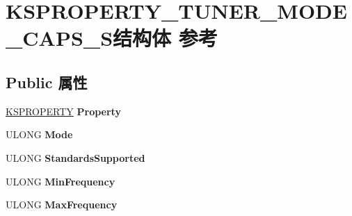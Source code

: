 \hypertarget{struct_k_s_p_r_o_p_e_r_t_y___t_u_n_e_r___m_o_d_e___c_a_p_s___s}{}\section{K\+S\+P\+R\+O\+P\+E\+R\+T\+Y\+\_\+\+T\+U\+N\+E\+R\+\_\+\+M\+O\+D\+E\+\_\+\+C\+A\+P\+S\+\_\+\+S结构体 参考}
\label{struct_k_s_p_r_o_p_e_r_t_y___t_u_n_e_r___m_o_d_e___c_a_p_s___s}
\subsection*{Public 属性}
\begin{DoxyCompactItemize}
\item 
\mbox{\label{struct_k_s_p_r_o_p_e_r_t_y___t_u_n_e_r___m_o_d_e___c_a_p_s___s_a3044594987a128f1148bae15dc81c62f}} 
\hyperlink{struct_k_s_i_d_e_n_t_i_f_i_e_r}{K\+S\+P\+R\+O\+P\+E\+R\+TY} {\bfseries Property}
\item 
\mbox{\label{struct_k_s_p_r_o_p_e_r_t_y___t_u_n_e_r___m_o_d_e___c_a_p_s___s_a80a21c9d99910808aabd4817a2747376}} 
U\+L\+O\+NG {\bfseries Mode}
\item 
\mbox{\label{struct_k_s_p_r_o_p_e_r_t_y___t_u_n_e_r___m_o_d_e___c_a_p_s___s_ab5366bffbcc4425922529e4c435b238b}} 
U\+L\+O\+NG {\bfseries Standards\+Supported}
\item 
\mbox{\label{struct_k_s_p_r_o_p_e_r_t_y___t_u_n_e_r___m_o_d_e___c_a_p_s___s_aa3a8134cbbaa2df74de4e0d600e9d9df}} 
U\+L\+O\+NG {\bfseries Min\+Frequency}
\item 
\mbox{\label{struct_k_s_p_r_o_p_e_r_t_y___t_u_n_e_r___m_o_d_e___c_a_p_s___s_a6ca556b03eed131102bc2a67204fb1ed}} 
U\+L\+O\+NG {\bfseries Max\+Frequency}
\item 
\mbox{\label{struct_k_s_p_r_o_p_e_r_t_y___t_u_n_e_r___m_o_d_e___c_a_p_s___s_aec2eafe1309dcbd7afb535f1826c7f34}} 

\end{DoxyCompactItemize}
